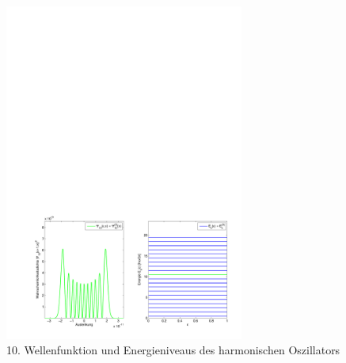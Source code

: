 \begin{refsection}
\begin{figure}	%
\centering
\includegraphics[width=0.7\textwidth]{anharmonisch/images/Harmonisch.pdf}
\caption{10. Wellenfunktion und Energieniveaus des harmonischen Oszillators
\label{skript:Harmonisch}}
\end{figure}


\end{refsection}
